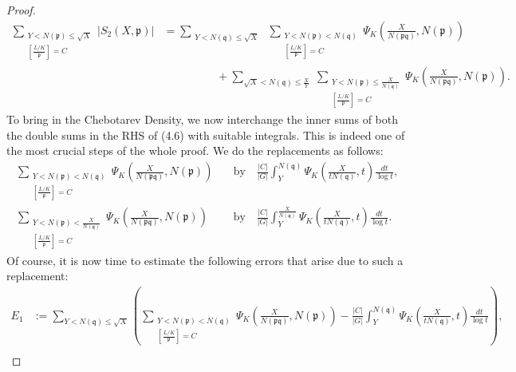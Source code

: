 \documentclass[10pt,a4paper]{amsart}
\begin{document}
\begin{proof}
\begin{align}
            \sum_{\substack{Y<N(\mathfrak{p}) \leq \sqrt{X} \\ \left[\frac{L/K}{\mathfrak{p}}\right] =C}} |S_2(X,\mathfrak{p})| &= \sum_{\substack{Y <N(\mathfrak{q}) \leq \sqrt{X}}} \;  \sum_{\substack{Y<N(\mathfrak{p})<N(\mathfrak{q}) \\ \left[\frac{L/K}{\mathfrak{p}}\right] =C}} \Psi_K\left(\frac{X}{N(\mathfrak{p}\mathfrak{q})},N(\mathfrak{p})\right) \nonumber \\ &\hspace{2cm}+ \sum_{\sqrt{X} < N(\mathfrak{q}) \leq \frac{X}{Y}} \;\sum_{\substack{Y<N(\mathfrak{p})\leq \frac{X}{N(\mathfrak{q})} \\ \left[\frac{L/K}{\mathfrak{p}}\right] =C} } \Psi_K\left(\frac{X}{N(\mathfrak{p}\mathfrak{q})},N(\mathfrak{p})\right) .
        \end{align}
        To bring in the Chebotarev Density, we now interchange the inner sums of both the double sums in the RHS of (4.6) with suitable integrals. This is indeed one of the most crucial steps of the whole proof. We do the replacements as follows:
        \begin{align}
            \sum_{\substack{Y<N(\mathfrak{p})<N(\mathfrak{q}) \\ \left[\frac{L/K}{\mathfrak{p}}\right] =C}} \Psi_K\left(\frac{X}{N(\mathfrak{p}\mathfrak{q})},N(\mathfrak{p})\right) \quad &\text{by} \quad \frac{|C|}{|G|}\int_Y^{N(\mathfrak{q})} \Psi_K\left(\frac{X}{tN(\mathfrak{q})},t\right)\frac{dt}{\log t} ,\nonumber \\
     \sum_{\substack{Y<N(\mathfrak{p})<\frac{X}{N(\mathfrak{q})} \\ \left[\frac{L/K}{\mathfrak{p}}\right] =C}} \Psi_K\left(\frac{X}{N(\mathfrak{p}\mathfrak{q})},N(\mathfrak{p})\right) \quad &\text{by} \quad \frac{|C|}{|G|}\int_Y^{\frac{X}{N(\mathfrak{q})}} \Psi_K\left(\frac{X}{tN(\mathfrak{q})},t\right)\frac{dt}{\log t}. \nonumber
        \end{align}
         Of course, it is now time to estimate the following errors that arise due to such a replacement:
    \begin{align}
        E_1&:=\sum_{Y<N(\mathfrak{q})\leq \sqrt{X}}\left(\sum_{\substack{Y<N(\mathfrak{p})<N(\mathfrak{q}) \\ \left[\frac{L/K}{\mathfrak{p}}\right] =C}} \Psi_K\left(\frac{X}{N(\mathfrak{p}\mathfrak{q})},N(\mathfrak{p})\right) - \frac{|C|}{|G|}\int_Y^{N(\mathfrak{q})} \Psi_K\left(\frac{X}{tN(\mathfrak{q})},t\right)\frac{dt}{\log t}\right) ,\nonumber \\

\end{align}
\end{proof}
\end{document}
